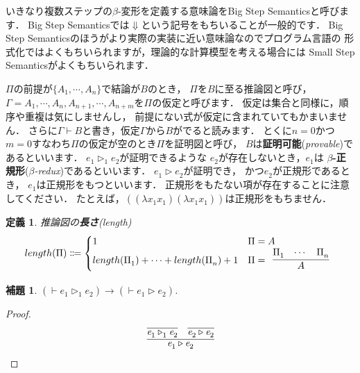 \documentclass{ltjsbook}%
\newtheorem{lemma}{補題}[section]%
\newtheorem{definition}{定義}[section]%
\newcommand\term[2]{\textbf{#1}{(\textit{#2})}}%
\begin{document}
いきなり複数ステップの$\beta$-変形を定義する意味論をBig Step Semanticsと呼びます．%
Big Step Semanticsでは$\Downarrow$という記号をもちいることが一般的です．%
Big Step Semanticsのほうがより実際の実装に近い意味論なのでプログラム言語の%
形式化ではよくもちいられますが，理論的な計算模型を考える場合には%
Small Step Semanticsがよくもちいられます．%
\par$\Pi$の前提が$\{A_1^{},\cdots,A_n^{}\}$で結論が$B$のとき，%
$\Pi$を$B$に至る推論図と呼び，%
$\Gamma=A_1^{},\cdots,A_n^{},A_{n+1}^{},\cdots,A_{n+m}^{}$を$\Pi$の仮定と呼びます．%
仮定は集合と同様に，順序や重複は気にしませんし，%
前提にない式が仮定に含まれていてもかまいません．%
さらに$\Gamma\vdash B$と書き，仮定$\Gamma$から$B$がでると読みます．%
とくに$n=0$かつ$m=0$すなわち$\Pi$の仮定が空のとき$\Pi$を証明図と呼び，%
$B$は\term{証明可能}{provable}であるといいます．%
$\mathit{e}_1^{}\triangleright_1^{}\mathit{e}_2^{}$が証明できるような%
$\mathit{e}_2^{}$が存在しないとき，$\mathit{e}_1^{}$は%
\term{$\beta$-正規形}{$\beta$-redux}であるといいます．%
$\mathit{e}_1^{}\triangleright\mathit{e}_2^{}$が証明でき，%
かつ$\mathit{e}_2^{}$が正規形であるとき，%
$\mathit{e}_1^{}$は正規形をもつといいます．%
正規形をもたない項が存在することに注意してください．%
たとえば，$((\lambda x_1^{}x_1^{})(\lambda x_1^{}x_1^{}))$は正規形をもちません．%
\begin{definition}%
推論図の\term{長さ}{length}%
\begin{equation}%
  length(\Pi)\Coloneqq\begin{cases}%
  1&\Pi=A\\%
  length(\Pi_1^{})+\cdots+length(\Pi_n^{})+1%
  &\Pi=\begin{array}{c}\infer{A}{\Pi_1^{}&\cdots&\Pi_n^{}}\end{array}%
  \end{cases}%
\end{equation}%
\end{definition}%
\begin{lemma}%
  \label{lemma:beta_reduct1n}%
  $(\vdash\mathit{e}_1^{}\triangleright_1^{}\mathit{e}_2^{})\rightarrow%
  (\vdash\mathit{e}_1^{}\triangleright\mathit{e}_2^{})$.%
\end{lemma}%
\begin{proof}%
  \begin{equation}%
    \infer{%
      \mathit{e}_1^{}\triangleright\mathit{e}_2^{}%
    }{%
      \infer{\mathit{e}_1^{}\triangleright_1^{}\mathit{e}_2^{}}{}%
    &%
      \infer{\mathit{e}_2^{}\triangleright\mathit{e}_2^{}}{}%
    }%
  \end{equation}%
\end{proof}%
\end{document}
